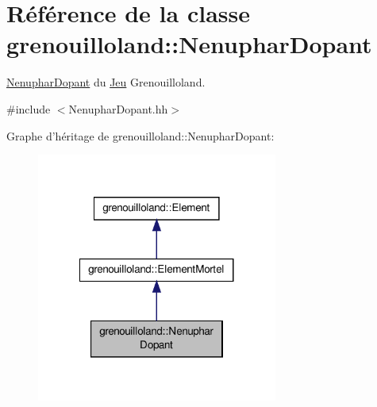 \hypertarget{classgrenouilloland_1_1NenupharDopant}{\section{Référence de la classe grenouilloland\-:\-:Nenuphar\-Dopant}
\label{classgrenouilloland_1_1NenupharDopant}
}


\hyperlink{classgrenouilloland_1_1NenupharDopant}{Nenuphar\-Dopant} du \hyperlink{classgrenouilloland_1_1Jeu}{Jeu} Grenouilloland.  




{\ttfamily \#include $<$Nenuphar\-Dopant.\-hh$>$}



Graphe d'héritage de grenouilloland\-:\-:Nenuphar\-Dopant\-:
\nopagebreak
\begin{figure}[H]
\begin{center}
\leavevmode
\includegraphics[width=224pt]{classgrenouilloland_1_1NenupharDopant__inherit__graph}
\end{center}
\end{figure}


